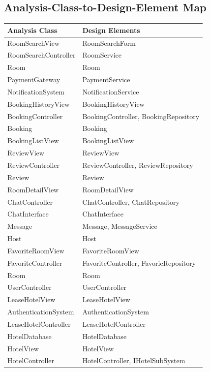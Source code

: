 \subsection{Analysis-Class-to-Design-Element Map}
\begin{longtable}{|p{6cm}|p{9cm}|}
\hline
\textbf{Analysis Class} & \textbf{Design Elements} \\
\hline
RoomSearchView & RoomSearchForm \\
\hline
RoomSearchController & RoomService \\
\hline
Room & Room \\
\hline
PaymentGateway & PaymentService \\
\hline
NotificationSystem & NotificationService\\
\hline
BookingHistoryView & BookingHistoryView \\
\hline
BookingController & BookingController, BookingRepository \\
\hline
Booking & Booking \\
\hline
BookingListView & BookingListView \\
\hline
ReviewView & ReviewView \\
\hline
ReviewController & ReviewController, ReviewRepository \\
\hline
Review & Review \\
\hline
RoomDetailView & RoomDetailView \\
\hline
ChatController & ChatController, ChatRepository \\
\hline
ChatInterface & ChatInterface \\
\hline
Message & Message,  MessageService \\
\hline
Host & Host \\
\hline
FavoriteRoomView & FavoriteRoomView \\
\hline
FavoriteController & FavoriteController, FavorieRepository \\
\hline
Room & Room \\
\hline
UserController & UserController \\
\hline
LeaseHotelView & LeaseHotelView \\
\hline
AuthenticationSystem & AuthenticationSystem \\
\hline
LeaseHotelController & LeaseHotelController \\
\hline
HotelDatabase & HotelDatabase \\
\hline
HotelView & HotelView \\
\hline
HotelController & HotelController, IHotelSubSystem \\

\end{longtable}
